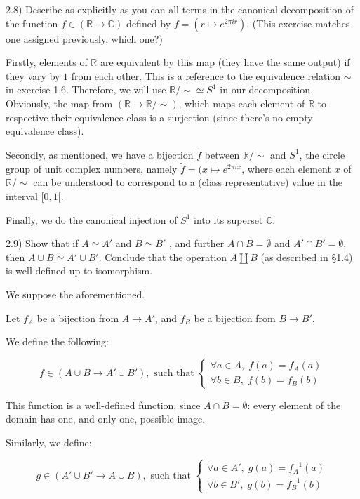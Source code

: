 2.8) Describe as explicitly as you can all terms in the canonical decomposition of the function $f \in (\mathbb{R} \to \mathbb{C})$ deﬁned by $f = (r \mapsto e^{2 \pi i r})$. (This exercise matches one assigned previously, which one?)

Firstly, elements of $\mathbb{R}$ are equivalent by this map (they have the same output) if they vary by $1$ from each other. This is a reference to the equivalence relation $\sim$ in exercise 1.6. Therefore, we will use $\mathbb{R}/\sim \simeq S^1$ in our decomposition. Obviously, the map from $(\mathbb{R} \to \mathbb{R}/\sim)$, which maps each element of $\mathbb{R}$ to respective their equivalence class is a surjection (since there's no empty equivalence class).

Secondly, as mentioned, we have a bijection $\tilde{f}$ between $\mathbb{R}/\sim$ and $S^1$, the circle group of unit complex numbers, namely $\tilde{f} = (x \mapsto e^{2 \pi i x}$, where each element $x$ of $\mathbb{R}/\sim$ can be understood to correspond to a (class representative) value in the interval $[0, 1[$.

Finally, we do the canonical injection of $S^1$ into its superset $\mathbb{C}$.



2.9) Show that if $A \simeq A'$ and $B \simeq B'$ , and further $A \cap B = \emptyset$ and $A' \cap B' = \emptyset$, then $A \cup B \simeq A' \cup B'$. Conclude that the operation $A \coprod B$ (as described in §1.4) is well-deﬁned up to isomorphism.

We suppose the aforementioned.

Let $f_A$ be a bijection from $A \to A'$, and $f_B$ be a bijection from $B \to B'$.

We define the following:

$$
f \in (A \cup B \to A' \cup B'),
\text{ such that }
\begin{cases}
	\forall a \in A, \; f(a) = f_A(a) \\
	\forall b \in B, \; f(b) = f_B(b)
\end{cases}
$$

This function is a well-defined function, since $A \cap B = \emptyset$: every element of the domain has one, and only one, possible image.

Similarly, we define:

$$
g \in (A' \cup B' \to A \cup B),
\text{ such that }
\begin{cases}
	\forall a \in A', \; g(a) = f_A^{-1}(a) \\
	\forall b \in B', \; g(b) = f_B^{-1}(b)
\end{cases}
$$

